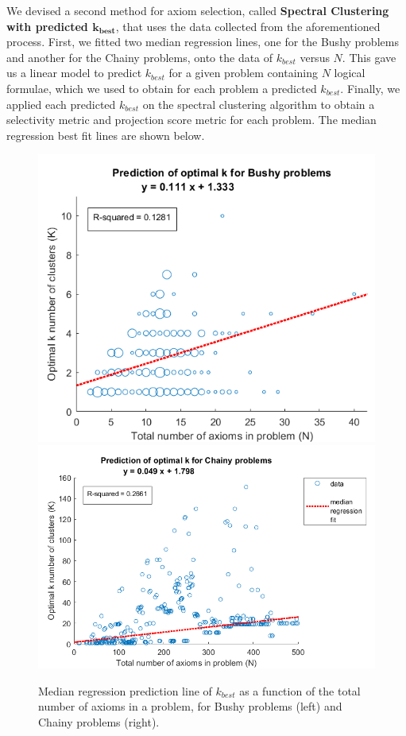 \documentclass[EPiC]{easychair}
\begin{document}
We devised a second method for axiom selection, called 
\textbf{Spectral Clustering with predicted $\mathbf{k_{best}}$}, that uses 
the data collected from the aforementioned process. First, we fitted two
median regression lines, one for the Bushy problems and another for the 
Chainy problems, onto the data of $k_{best}$ versus $N$. This gave us a 
linear model to predict $k_{best}$ for a given problem containing $N$
logical formulae, which we used to obtain for each problem a predicted
$k_{best}$. Finally, we applied each predicted $k_{best}$ on the spectral
clustering algorithm to obtain a selectivity metric and projection score
metric for each problem. The median regression best fit lines are shown 
below.
\begin{figure}[H]
	\centering
	\includegraphics[scale=0.41]{median-regression-optimal-k-bushy.png}
	\includegraphics[scale=0.41]{median-regression-optimal-k-chainy.png}
	\vspace{1mm}
	\caption{ Median regression prediction line of $k_{best}$ as a function 
	of the total number of axioms in a problem, for Bushy problems (left) 
	and Chainy problems (right). }
	\label{fig:median-regression}
\end{figure}
\end{document}
